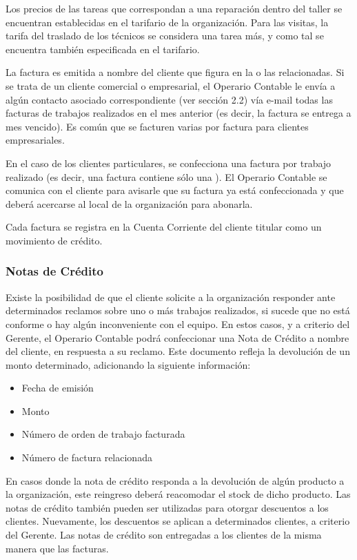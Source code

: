 \documentclass[12pt]{extarticle}
\begin{document}
\begin{spacing}{1.2}
    Los precios de las tareas que correspondan a una reparación dentro del taller se encuentran establecidas en el tarifario de la organización. Para las visitas, la tarifa del traslado de los técnicos se considera una tarea más, y como tal se encuentra también especificada en el tarifario.

    La factura es emitida a nombre del cliente que figura en la o las \OTs{} relacionadas. Si se trata de un cliente comercial o empresarial, el Operario Contable le envía a algún contacto asociado correspondiente (ver sección 2.2) vía e-mail todas las facturas de trabajos realizados en el mes anterior (es decir, la factura se entrega a mes vencido). Es común que se facturen varias \OTs{} por factura para clientes empresariales.
    
    En el caso de los clientes particulares, se confecciona una factura por trabajo realizado (es decir, una factura contiene sólo una \OT{}). El Operario Contable se comunica con el cliente para avisarle que su factura ya está confeccionada y que deberá acercarse al local de la organización para abonarla.
   
    Cada factura se registra en la Cuenta Corriente del cliente titular como un movimiento de crédito. \\

    \subsubsection*{Notas de Crédito}
    Existe la posibilidad de que el cliente solicite a la organización responder ante determinados reclamos sobre uno o más trabajos realizados, si sucede que no está conforme o hay algún inconveniente con el equipo. En estos casos, y a criterio del Gerente, el Operario Contable podrá confeccionar una Nota de Crédito a nombre del cliente, en respuesta a su reclamo. Este documento refleja la devolución de un monto determinado, adicionando la siguiente información: \\
    \begin{itemize}
        \item Fecha de emisión
        \item Monto
        \item Número de orden de trabajo facturada
        \item Número de factura relacionada
    \end{itemize}

	En casos donde la nota de crédito responda a la devolución de algún producto a la organización, este reingreso deberá reacomodar el stock de dicho producto.
	Las notas de crédito también pueden ser utilizadas para otorgar descuentos a los clientes. Nuevamente, los descuentos se aplican a determinados clientes, a criterio del Gerente.
	Las notas de crédito son entregadas a los clientes de la misma manera que las facturas.\\
	

\end{spacing}
\end{document}
